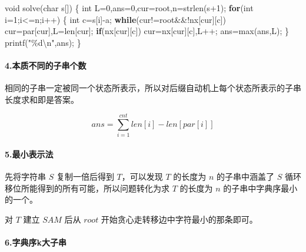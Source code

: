 \documentclass[
]{article}
\newenvironment{Shaded}{}{}
\newcommand{\CharTok}[1]{\textcolor[rgb]{0.25,0.44,0.63}{#1}}
\newcommand{\ControlFlowTok}[1]{\textcolor[rgb]{0.00,0.44,0.13}{\textbf{#1}}}
\newcommand{\DataTypeTok}[1]{\textcolor[rgb]{0.56,0.13,0.00}{#1}}
\newcommand{\DecValTok}[1]{\textcolor[rgb]{0.25,0.63,0.44}{#1}}
\newcommand{\NormalTok}[1]{#1}
\newcommand{\SpecialCharTok}[1]{\textcolor[rgb]{0.25,0.44,0.63}{#1}}
\newcommand{\StringTok}[1]{\textcolor[rgb]{0.25,0.44,0.63}{#1}}
\begin{document}
\begin{Shaded}
\begin{Highlighting}[]
\DataTypeTok{void}\NormalTok{ solve(}\DataTypeTok{char}\NormalTok{ s[])}
\NormalTok{\{}
    \DataTypeTok{int}\NormalTok{ L=}\DecValTok{0}\NormalTok{,ans=}\DecValTok{0}\NormalTok{,cur=root,n=strlen(s+}\DecValTok{1}\NormalTok{);}
    \ControlFlowTok{for}\NormalTok{(}\DataTypeTok{int}\NormalTok{ i=}\DecValTok{1}\NormalTok{;i\textless{}=n;i++)}
\NormalTok{    \{}
        \DataTypeTok{int}\NormalTok{ c=s[i]{-}}\CharTok{\textquotesingle{}a\textquotesingle{}}\NormalTok{;}
        \ControlFlowTok{while}\NormalTok{(cur!=root\&\&!nx[cur][c])}
\NormalTok{            cur=par[cur],L=len[cur];}
        \ControlFlowTok{if}\NormalTok{(nx[cur][c]) cur=nx[cur][c],L++;}
\NormalTok{        ans=max(ans,L);}
\NormalTok{    \}}
\NormalTok{    printf(}\StringTok{"}\SpecialCharTok{\%d\textbackslash{}n}\StringTok{"}\NormalTok{,ans);}
\NormalTok{\}}
\end{Highlighting}
\end{Shaded}

\hypertarget{ux672cux8d28ux4e0dux540cux7684ux5b50ux4e32ux4e2aux6570}{%
\paragraph{4.本质不同的子串个数}\label{ux672cux8d28ux4e0dux540cux7684ux5b50ux4e32ux4e2aux6570}}

相同的子串一定被同一个状态所表示，所以对后缀自动机上每个状态所表示的子串长度求和即是答案。

\[ans = \sum_{i=1}^{cnt}len[i]-len[par[i]]\]

\hypertarget{ux6700ux5c0fux8868ux793aux6cd5}{%
\paragraph{5.最小表示法}\label{ux6700ux5c0fux8868ux793aux6cd5}}

先将字符串 \(S\) 复制一倍后得到 \(T\)，可以发现 \(T\) 的长度为 \(n\)
的子串中涵盖了 \(S\) 循环移位所能得到的所有可能，所以问题转化为求 \(T\)
的长度为 \(n\) 的子串中字典序最小的一个。

对 \(T\) 建立 \(SAM\) 后从 \(root\)
开始贪心走转移边中字符最小的那条即可。

\hypertarget{ux5b57ux5178ux5e8fkux5927ux5b50ux4e32}{%
\paragraph{6.字典序k大子串}\label{ux5b57ux5178ux5e8fkux5927ux5b50ux4e32}}
\end{document}
